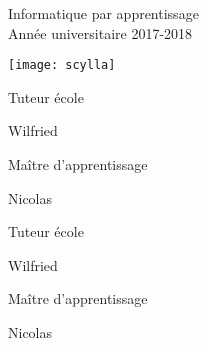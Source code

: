 

{
	\BgThispage
	\thispagestyle{couverture}
	
	
	\makeatletter
	{\LARGE\bfseries\@title\par}
	{\color{aqua}Informatique par apprentissage \\
	\color{aqua}Année universitaire 2017-2018}
	\hfill
	\vspace{0.5cm}
	
	\texttt{[image: scylla]}
	\vspace{0.5cm}
	
	\begin{minipage}[c]{0.5\textwidth}
	Tuteur école \par
	{\color{aqua} Wilfried }
	
	\vspace{0.5cm}
	
	Maître d'apprentissage \par
	{\color{aqua} Nicolas }
	\end{minipage}
	\begin{minipage}[c]{0.5\textwidth}
	Tuteur école \par
	{\color{aqua} Wilfried }
	
	\vspace{0.5cm}
	
	Maître d'apprentissage \par
	{\color{aqua} Nicolas }
	\end{minipage}
	
		
		
	
	\makeatother
	
	\vfill
	
	\afterpage{\blankpage}
	\restoregeometry
}